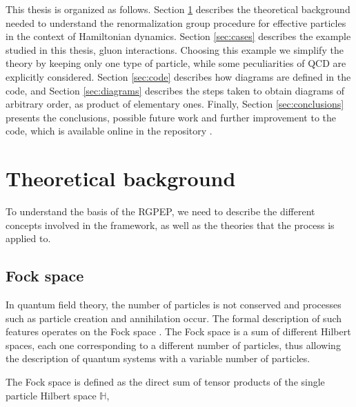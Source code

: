 \documentclass[11pt,a4paper,twoside,pdf]{article}
\numberwithin{equation}{section}
\begin{document}
This thesis is organized as follows. Section \ref{sec:theoretical_background} describes
the theoretical background needed to understand the renormalization group procedure
for effective particles in the context of Hamiltonian dynamics. Section \ref{sec:cases}
describes the example studied in this thesis, gluon interactions. Choosing this example
we simplify the theory by keeping only one type of particle, while some peculiarities of QCD are 
explicitly considered. Section \ref{sec:code} describes how diagrams are defined in the code, 
and Section \ref{sec:diagrams} describes the steps taken to obtain diagrams of arbitrary order,
as product of elementary ones. Finally, 
Section \ref{sec:conclusions} presents the conclusions, possible future work and 
further improvement to the code, which is available online in the repository \cite{Liu_Computational_tools_for_2025}.

\section{Theoretical background} \label{sec:theoretical_background}

To understand the basis of the RGPEP, we need to describe the different
concepts involved in the framework, as well as the theories that the process is
applied to.

\subsection{Fock space} \label{sec:fock_space}

In quantum field theory, the number of particles is not conserved 
and processes such as particle creation and annihilation occur. The formal 
description of such features operates on the Fock space 
\cite{1932ZPhy...75..622F}. The Fock space is a sum 
of different Hilbert spaces, each one corresponding to a different number of particles, 
thus allowing the description of quantum systems with a variable number of particles. 


The Fock space is defined as the direct sum of tensor products of the single 
particle Hilbert space $\mathbb{H}$,

\end{document}
